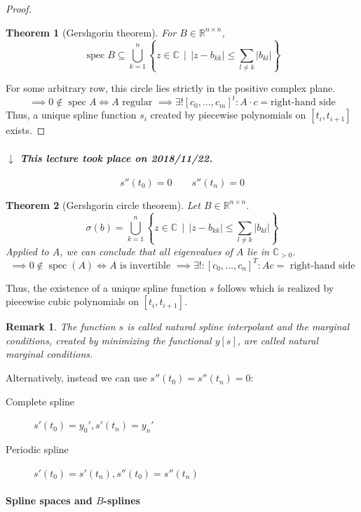 \documentclass[a4paper]{article}
\numberwithin{lecref}{section}
\theoremstyle{break}
\newtheorem*{Thm}{Theorem}
\newtheorem*{Remark}{Remark}
\newcommand{\dateref}[1]{%
  \begin{mdframed}[backgroundcolor=gray!10,innerbottommargin=0pt,innertopmargin=0pt]
    \paragraph{\textit{$\downarrow$ This lecture took place on #1.}}%
  \end{mdframed}%
}
\newcommand{\Abs}[1]{\left|#1\right|}
\newcommand{\SetDef}[2]{\left\{#1\,\mid\,#2\right\}}
\DeclareMathOperator{\spec}{spec}
\begin{document}
\begin{proof}
  \begin{Thm}[Gershgorin theorem]
    For $B \in \mathbb R^{n\times n}$,
    \[ \spec{B} \subseteq \bigcup_{k=1}^n\SetDef{z \in \mathbb C}{\Abs{z - b_{kk}} \leq \sum_{l \neq k} \Abs{b_{kl}}} \]
  \end{Thm}

  For some arbitrary row, this circle lies strictly in the positive complex plane.
  \[ \implies 0 \not\in \spec{A} \iff A \text{ regular } \implies \exists! [c_0, \dots, c_m]^t: A\cdot c = \text{right-hand side} \]
  Thus, a unique spline function $s_i$ created by piecewise polynomials on $[t_i, t_{i+1}]$ exists.
\end{proof}

\dateref{2018/11/22}

\[ s''(t_0) = 0 \qquad s''(t_n) = 0 \]

\begin{Thm}[Gershgorin circle theorem]
  Let $B \in \mathbb R^{n \times n}$.
  \[ \sigma(b) = \bigcup_{k=1}^n \SetDef{z \in \mathbb C}{\Abs{z - b_{kk}} \leq \sum_{l \neq k} \Abs{b_{kl}}} \]
  Applied to $A$, we can conclude that all eigenvalues of $A$ lie in $\mathbb C_{> 0}$.
  \[ \implies 0 \not\in \spec(A) \iff A \text{ is invertible } \implies \exists!: [c_0, \dots, c_n]^T: Ac = \text{ right-hand side} \]
\end{Thm}

Thus, the existence of a unique spline function $s$ follows which is realized by piecewise cubic polynomials on $[t_i, t_{i+1}]$.

\begin{Remark}
  The function $s$ is called \emph{natural spline interpolant} and the marginal conditions, created by minimizing the functional $y[s]$, are called \emph{natural marginal conditions}.
\end{Remark}

Alternatively, instead we can use $s''(t_0) = s''(t_n) = 0$:
\begin{description}
  \item[Complete spline]  $s'(t_0) = y_0', s'(t_n) = y_n'$
  \item[Periodic spline] $s'(t_0) = s'(t_n), s''(t_0) = s''(t_n)$
\end{description}

\paragraph{Spline spaces and $B$-splines}
\end{document}
